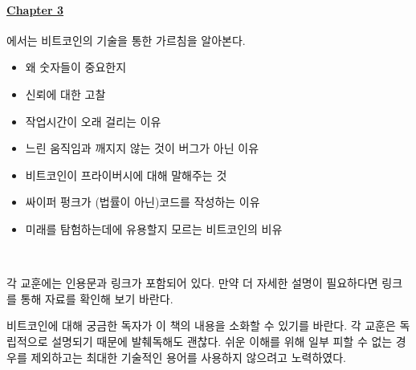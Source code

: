 \paragraph{\hyperref[ch:technology]{Chapter 3}}{에서는 비트코인의 기술을 통한 가르침을 알아본다.
\begin{itemize}
	\item 왜 숫자들이 중요한지
	\item 신뢰에 대한 고찰
	\item 작업시간이 오래 걸리는 이유
	\item 느린 움직임과 깨지지 않는 것이 버그가 아닌 이유
	\item 비트코인이 프라이버시에 대해 말해주는 것
	\item 싸이퍼 펑크가 (법률이 아닌)코드를 작성하는 이유
	\item 미래를 탐험하는데에 유용할지 모르는 비트코인의 비유
\end{itemize}}

~

각 교훈에는 인용문과 링크가 포함되어 있다. 만약 더 자세한 설명이 필요하다면 링크를 통해 자료를 확인해 보기
바란다.

비트코인에 대해 궁금한 독자가 이 책의 내용을 소화할 수 있기를 바란다. 각 교훈은 독립적으로 설명되기 때문에
발췌독해도 괜찮다. 쉬운 이해를 위해 일부 피할 수 없는 경우를 제외하고는 최대한 기술적인 용어를 사용하지 않으려고 노력하였다.

